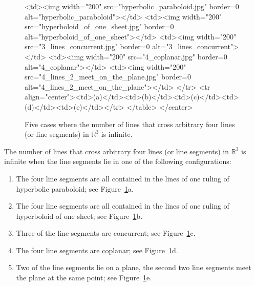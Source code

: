 \begin{figure}
\begin{ccHtmlOnly}
<td><img width="200" src="hyperbolic_paraboloid.jpg" border=0 alt="hyperbolic_paraboloid"></td>
<td><img width="200" src="hyperboloid_of_one_sheet.jpg" border=0 alt="hyperboloid_of_one_sheet"></td>
<td><img width="200" src="3_lines_concurrent.jpg" border=0 alt="3_lines_concurrent"></td>
<td><img width="200" src="4_coplanar.jpg" border=0 alt="4_coplanar"></td>
<td><img width="200" src="4_lines_2_meet_on_the_plane.jpg" border=0 alt="4_lines_2_meet_on_the_plane"></td>
</tr>
<tr align="center"><td>(a)</td><td>(b)</td><td>(c)</td><td>(d)</td><td>(e)</td></tr>
</table>
</center>
\end{ccHtmlOnly}
\begin{center}
\caption{Five cases where the number of lines that cross arbitrary
  four lines (or line segments) in $\mathbb{R}^3$ is infinite.}
\end{center}
\label{fig:transversals-infinite}
\end{figure}

The number of lines that cross arbitrary four lines (or line segments)
in $\mathbb{R}^3$ is infinite when the line segments lie in one of the
following configurations:
\begin{enumerate}
\item%
  The four line segments are all contained in the lines of one ruling of
  hyperbolic paraboloid; see Figure~\ref{fig:transversals-infinite}a.
\item%
  The four line segments are all contained in the lines of one ruling of
  hyperboloid of one sheet; see Figure~\ref{fig:transversals-infinite}b.
\item%
  Three of the line segments are concurrent; see
  Figure~\ref{fig:transversals-infinite}c.
\item%
  The four line segments are coplanar; see
  Figure~\ref{fig:transversals-infinite}d. 
\item%
  Two of the line segments lie on a plane, the second two line segments
  meet the plane at the same point; see
  Figure~\ref{fig:transversals-infinite}e.
\end{enumerate}

